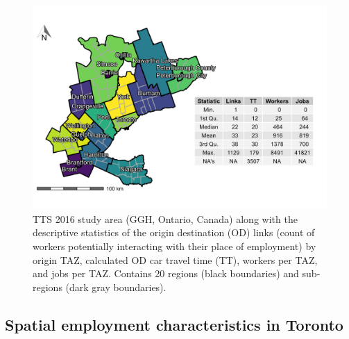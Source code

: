 \documentclass[10pt,letterpaper]{article}
\begin{document}
\begin{figure}

{\centering \includegraphics[width=1\linewidth]{images/Fig3} 

}

\caption{\label{fig:Fig3}TTS 2016 study area (GGH, Ontario, Canada) along with the descriptive statistics of the origin destination (OD) links (count of workers potentially interacting with their place of employment) by origin TAZ, calculated OD car travel time (TT), workers per TAZ, and jobs per TAZ. Contains 20 regions (black boundaries) and sub-regions (dark gray boundaries).}\label{fig:TTS-16-survey-area}
\end{figure}

\hypertarget{spatial-employment-characteristics-in-toronto}{%
\subsection{Spatial employment characteristics in
Toronto}\label{spatial-employment-characteristics-in-toronto}}
\end{document}
